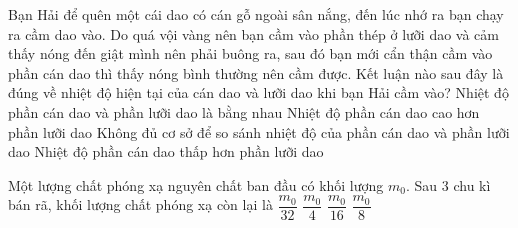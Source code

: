 	\begin{ex}%
		Bạn Hải để quên một cái dao có cán gỗ ngoài sân nắng, đến lúc nhớ ra bạn chạy ra cầm dao vào. Do quá vội vàng nên bạn cầm vào phần thép ở lưỡi dao và cảm thấy nóng đến giật mình nên phải buông ra, sau đó bạn mới cẩn thận cầm vào phần cán dao thì thấy nóng bình thường nên cầm được. Kết luận nào sau đây là đúng về nhiệt độ hiện tại của cán dao và lưỡi dao khi bạn Hải cầm vào?
		\choice
		{\True Nhiệt độ phần cán dao và phần lưỡi dao là bằng nhau}
		{Nhiệt độ phần cán dao cao hơn phần lưỡi dao}
		{Không đủ cơ sở để so sánh nhiệt độ của phần cán dao và phần lưỡi dao}
		{Nhiệt độ phần cán dao thấp hơn phần lưỡi dao}
	\end{ex}

	\begin{ex}%
		Một lượng chất phóng xạ nguyên chất ban đầu có khối lượng $m_0$. Sau $3$ chu kì bán rã, khối lượng chất phóng xạ còn lại là
		\choice
		{$\dfrac{m_0}{32}$}
		{$\dfrac{m_0}{4}$}
		{$\dfrac{m_0}{16}$}
		{\True $\dfrac{m_0}{8}$}
	\end{ex}

